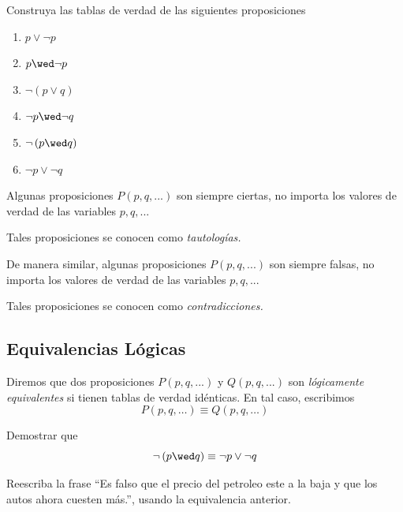 \begin{resuelto} Construya las tablas de verdad de las siguientes proposiciones
\begin{enumerate}
 \item $p\vee \neg p$
 \item $p\wed \neg p$
 \item $\neg\left( p \vee q \right)$
 \item $\neg p \wed \neg q$
 \item $\neg\left( p \wed q \right)$
 \item $\neg p \vee \neg q$
\end{enumerate}


\end{resuelto}


 Algunas proposiciones $P(p,q,...)$ son siempre ciertas, no importa los valores de verdad de las variables $p,q,...$


 Tales proposiciones se conocen como \emph{tautologías.}



 De manera similar, algunas proposiciones $P(p,q,...)$ son siempre falsas, no importa los valores de verdad de las variables $p,q,...$


 Tales proposiciones se conocen como \emph{contradicciones.}






\subsection{Equivalencias Lógicas}


 Diremos que dos proposiciones $P(p,q,...)$ y $Q(p,q,...)$ son \emph{lógicamente equivalentes} si tienen tablas de verdad idénticas. En tal caso, escribimos $$P(p,q,\dots)\equiv Q(p,q,\dots)$$



 \begin{resuelto} Demostrar que
  $$
  \neg\left( p \wed q \right) \equiv \neg p \vee \neg q
  $$
 \end{resuelto}




 \begin{resuelto}
  Reescriba la frase ``Es falso que el precio del petroleo este a la baja y que los autos ahora cuesten más.'', usando la equivalencia anterior.
 \end{resuelto}





